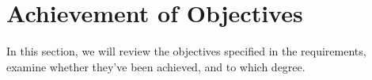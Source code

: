 \section{Achievement of Objectives}\label{sec:achievement-of-objectives}
In this section, we will review the objectives specified in the requirements,
examine whether they've been achieved, and to which degree.


